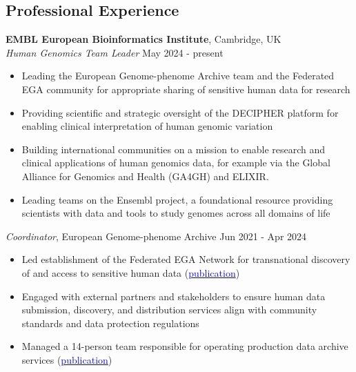 \documentclass[margin,line]{res}
\begin{document}
\begin{resume}

\section{\sc Professional Experience}
{\bf EMBL European Bioinformatics Institute}, Cambridge, UK\\
{\em Human Genomics Team Leader} \hfill {May 2024 - present}
\begin{itemize}
\itemsep0em 
	\item Leading the European Genome-phenome Archive team and the Federated EGA community for appropriate sharing of sensitive human data for research
	\item Providing scientific and strategic oversight of the DECIPHER platform for enabling clinical interpretation of human genomic variation
	\item Building international communities on a mission to enable research and clinical applications of human genomics data, for example via the Global Alliance for Genomics and Health (GA4GH) and ELIXIR.
	\item Leading teams on the Ensembl project, a foundational resource providing scientists with data and tools to study genomes across all domains of life
\end{itemize}

{\em Coordinator}, European Genome-phenome Archive \hfill {Jun 2021 - Apr 2024}
\begin{itemize}
\itemsep0em 
	\item Led establishment of the Federated EGA Network for transnational discovery of and access to sensitive human data (\href{https://www.nature.com/articles/s41588-025-02101-9}{\textcolor{blue}{publication}})
	\item Engaged with external partners and stakeholders to ensure human data submission, discovery, and distribution services align with community standards and data protection regulations
	\item Managed a 14-person team responsible for operating production data archive services (\href{https://doi.org/10.1093/nar/gkab1059}{\textcolor{blue}{publication}})
\end{itemize}


\end{resume}
\end{document}
